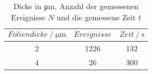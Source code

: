 \begin{table}[H] 
   \centering 
   \caption{Dicke in \si{\micro \meter}, Anzahl der gemessenen Ereignisse $N$ und die gemessene Zeit $t$} 
   \label{tab:foliendicke} 
   \begin{tabular} { c c c } 
 \toprule 
 {$Foliendicke\:/\: \si{\micro \meter}$} & {$Ereignisse$} & {$Zeit\:/\: \mathrm{s}$} \\ 
    \midrule 
    2 & 1226 & 132 \\ 
    4 & 26 & 300 \\ 
    \bottomrule 
  \end{tabular}
\end{table}